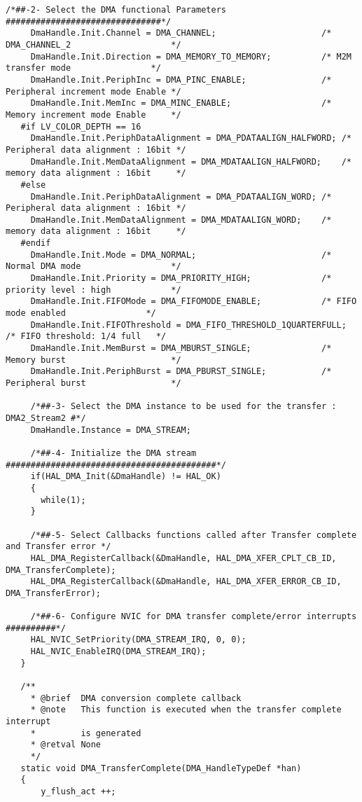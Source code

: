 \begin{lstlisting}[captionpos=t, caption={Fichero \texttt{tft.c}}]
     /*##-2- Select the DMA functional Parameters ###############################*/
     DmaHandle.Init.Channel = DMA_CHANNEL;                     /* DMA_CHANNEL_2                    */
     DmaHandle.Init.Direction = DMA_MEMORY_TO_MEMORY;          /* M2M transfer mode                */
     DmaHandle.Init.PeriphInc = DMA_PINC_ENABLE;               /* Peripheral increment mode Enable */
     DmaHandle.Init.MemInc = DMA_MINC_ENABLE;                  /* Memory increment mode Enable     */
   #if LV_COLOR_DEPTH == 16
     DmaHandle.Init.PeriphDataAlignment = DMA_PDATAALIGN_HALFWORD; /* Peripheral data alignment : 16bit */
     DmaHandle.Init.MemDataAlignment = DMA_MDATAALIGN_HALFWORD;    /* memory data alignment : 16bit     */
   #else
     DmaHandle.Init.PeriphDataAlignment = DMA_PDATAALIGN_WORD; /* Peripheral data alignment : 16bit */
     DmaHandle.Init.MemDataAlignment = DMA_MDATAALIGN_WORD;    /* memory data alignment : 16bit     */
   #endif
     DmaHandle.Init.Mode = DMA_NORMAL;                         /* Normal DMA mode                  */
     DmaHandle.Init.Priority = DMA_PRIORITY_HIGH;              /* priority level : high            */
     DmaHandle.Init.FIFOMode = DMA_FIFOMODE_ENABLE;            /* FIFO mode enabled                */
     DmaHandle.Init.FIFOThreshold = DMA_FIFO_THRESHOLD_1QUARTERFULL; /* FIFO threshold: 1/4 full   */
     DmaHandle.Init.MemBurst = DMA_MBURST_SINGLE;              /* Memory burst                     */
     DmaHandle.Init.PeriphBurst = DMA_PBURST_SINGLE;           /* Peripheral burst                 */
   
     /*##-3- Select the DMA instance to be used for the transfer : DMA2_Stream2 #*/
     DmaHandle.Instance = DMA_STREAM;
   
     /*##-4- Initialize the DMA stream ##########################################*/
     if(HAL_DMA_Init(&DmaHandle) != HAL_OK)
     {
       while(1);
     }
   
     /*##-5- Select Callbacks functions called after Transfer complete and Transfer error */
     HAL_DMA_RegisterCallback(&DmaHandle, HAL_DMA_XFER_CPLT_CB_ID, DMA_TransferComplete);
     HAL_DMA_RegisterCallback(&DmaHandle, HAL_DMA_XFER_ERROR_CB_ID, DMA_TransferError);
   
     /*##-6- Configure NVIC for DMA transfer complete/error interrupts ##########*/
     HAL_NVIC_SetPriority(DMA_STREAM_IRQ, 0, 0);
     HAL_NVIC_EnableIRQ(DMA_STREAM_IRQ);
   }
   
   /**
     * @brief  DMA conversion complete callback
     * @note   This function is executed when the transfer complete interrupt
     *         is generated
     * @retval None
     */
   static void DMA_TransferComplete(DMA_HandleTypeDef *han)
   {
       y_flush_act ++;
   

\end{lstlisting}
